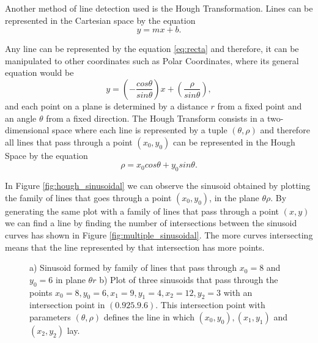 Another method of line detection used is the Hough Transformation\cite{illingworth1988survey}. Lines can be represented in the Cartesian space by the equation
\begin{equation}
	y=mx+b.
	\label{eq:recta}
\end{equation}

Any line can be represented by the equation \ref{eq:recta} and therefore, it can be manipulated to other coordinates such as Polar Coordinates, where its general equation would be
\begin{equation}
	y=\left( -\frac{cos \theta}{sin \theta} \right) x + \left(\frac{\rho}{sin \theta}\right),
\end{equation}
and each point on a plane is determined by a distance $r$ from a fixed point and an angle $\theta$ from a fixed direction.
The Hough Transform consists in a two-dimensional space where each line is represented by a tuple $(\theta,\rho)$ and therefore all lines that pass through a point $(x_{0}, y_{0})$ can be represented in the Hough Space by the equation
\begin{equation}
\rho = x_{0}cos\theta + y_{0}sin\theta.
\label{eq:hough_eq}
\end{equation}

In Figure \ref{fig:hough_sinusoidal} we can observe the sinusoid obtained by plotting the family of lines that goes through a point $(x_{0}, y_{0})$, in the plane $\theta \rho$. By generating the same plot with a family of lines that pass through a point $(x, y)$ we can find a line by finding the number of intersections between the sinusoid curves has shown in Figure \ref{fig:multiple_sinusoidal}. The more curves intersecting means that the line represented by that intersection has more points\cite{OCV}.
\begin{figure}[htbp]
	\centering
  \caption{a) Sinusoid formed by family of lines that pass through $x_{0} =8$ and $y_{0} = 6$ in plane $\theta r$ b) Plot of three sinusoids that pass through the points $x_{0} = 8,y_{0} = 6, x_{1} = 9,y_{1} = 4, x_{2} = 12, y_{2} = 3$ with an intersection point in $(0.925.9.6)$. This intersection point with parameters $(\theta,\rho)$ defines the line in which $(x_{0},y_{0}), (x_{1},y_{1})$ and $(x_{2},y_{2})$ lay\cite{OCV}.}
\end{figure}

